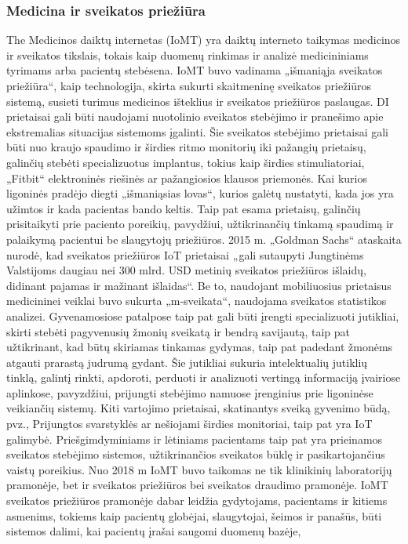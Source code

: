 \documentclass{VUMIFInfBakalaurinis}
\begin{document}
\subsubsection{Medicina ir sveikatos priežiūra}
The Medicinos daiktų internetas (IoMT) yra daiktų interneto taikymas medicinos ir sveikatos tikslais, tokais kaip duomenų rinkimas ir analizė medicininiams tyrimams arba pacientų stebėsena.
IoMT buvo vadinama „išmaniąja sveikatos priežiūra“, kaip technologija, skirta sukurti skaitmeninę sveikatos priežiūros sistemą, susieti turimus medicinos išteklius ir sveikatos priežiūros paslaugas.
DI prietaisai gali būti naudojami nuotolinio sveikatos stebėjimo ir pranešimo apie ekstremalias situacijas sistemoms įgalinti.
Šie sveikatos stebėjimo prietaisai gali būti nuo kraujo spaudimo ir širdies ritmo monitorių iki pažangių prietaisų, galinčių stebėti specializuotus implantus, tokius kaip širdies stimuliatoriai, „Fitbit“ elektroninės riešinės ar pažangiosios klausos priemonės.
Kai kurios ligoninės pradėjo diegti „išmaniąsias lovas“, kurios galėtų nustatyti, kada jos yra užimtos ir kada pacientas bando keltis.
Taip pat esama prietaisų, galinčių prisitaikyti prie paciento poreikių, pavydžiui, užtikrinančių tinkamą spaudimą ir palaikymą pacientui be slaugytojų priežiūros.
2015 m. „Goldman Sachs“ ataskaita nurodė, kad sveikatos priežiūros IoT prietaisai „gali sutaupyti Jungtinėms Valstijoms daugiau nei 300 mlrd. USD metinių sveikatos priežiūros išlaidų, didinant pajamas ir mažinant išlaidas“.
Be to, naudojant mobiliuosius prietaisus medicininei veiklai buvo sukurta „m-sveikata“, naudojama sveikatos statistikos analizei.
Gyvenamosiose patalpose taip pat gali būti įrengti specializuoti jutikliai, skirti stebėti pagyvenusių žmonių sveikatą ir bendrą savijautą, taip pat užtikrinant, kad būtų skiriamas tinkamas gydymas,
taip pat padedant žmonėms atgauti prarastą judrumą gydant. Šie jutikliai sukuria intelektualių jutiklių tinklą, galintį rinkti, apdoroti, perduoti ir analizuoti vertingą informaciją įvairiose aplinkose,
pavyzdžiui, prijungti stebėjimo namuose įrenginius prie ligoninėse veikiančių sistemų. Kiti vartojimo prietaisai, skatinantys sveiką gyvenimo būdą, pvz., Prijungtos svarstyklės ar nešiojami širdies monitoriai, taip pat yra IoT galimybė.
Priešgimdyminiams ir lėtiniams pacientams taip pat yra prieinamos sveikatos stebėjimo sistemos, užtikrinančios sveikatos būklę ir pasikartojančius vaistų poreikius.
Nuo 2018 m IoMT buvo taikomas ne tik klinikinių laboratorijų pramonėje, bet ir sveikatos priežiūros bei sveikatos draudimo pramonėje.
IoMT sveikatos priežiūros pramonėje dabar leidžia gydytojams, pacientams ir kitiems asmenims, tokiems kaip pacientų globėjai, slaugytojai, šeimos ir panašūs, būti sistemos dalimi, kai pacientų įrašai saugomi duomenų bazėje,
\end{document}
